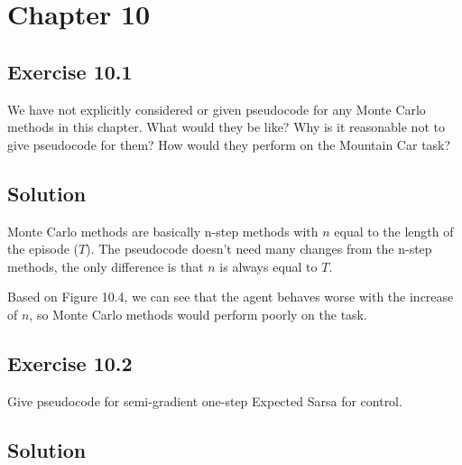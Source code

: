 \section{Chapter 10}

\subsection*{Exercise 10.1}

We have not explicitly considered or given pseudocode for any Monte Carlo
methods in this chapter. What would they be like? Why is it reasonable not to give
pseudocode for them? How would they perform on the Mountain Car task?
\subsection*{Solution}

Monte Carlo methods are basically n-step methods with $n$ equal to the length of the episode  ($T$).
The pseudocode doesn't need many changes from the n-step methods, the only difference is that $n$ is always equal to $T$.

Based on Figure 10.4, we can see that the agent behaves worse with the increase of $n$, so Monte Carlo methods would perform poorly on the task.

\subsection*{Exercise 10.2}

Give pseudocode for semi-gradient one-step Expected Sarsa for control.

\subsection*{Solution}

